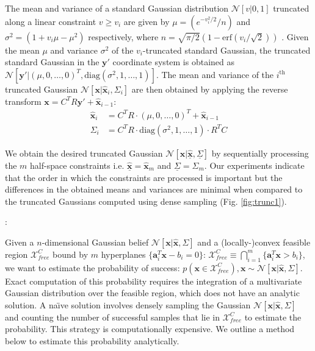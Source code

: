 \documentclass[letterpaper]{article}
\begin{document}
The mean and variance of a standard Gaussian distribution $\mathcal{N}[v|0,1]$ truncated along a linear constraint $v \geq v_i$ are given by $\mu = (e^{-v_i^2/2}/n)$ and $\sigma^2 = (1 + v_i\mu - \mu^2)$ respectively, where $n = \sqrt{\pi/2}(1 - \mathrm{erf}(v_i/\sqrt{2}))$ \cite{Toussaint09a}. Given the mean $\mu$ and variance $\sigma^2$ of the $v_i$-truncated standard Gaussian, the truncated standard Gaussian in the $\mathbf{y}'$ coordinate system is obtained as $\mathcal{N}[\mathbf{y'}|(\mu,0,\ldots,0)^T, \mathrm{diag}(\sigma^2,1,\ldots,1)]$. The mean and variance of the $i^{\mathrm{th}}$ truncated Gaussian $\mathcal{N}[\mathbf{x}|\hat{\mathbf{x}}_{i}, \Sigma_{i}]$ are then obtained by applying the reverse transform $\mathbf{x} = C^{T}R\mathbf{y'} + \hat{\mathbf{x}}_{i-1}$:
\begin{align*}
\hat{\mathbf{x}}_{i} &= C^TR\cdot(\mu,0,\ldots,0)^T + \hat{\mathbf{x}}_{i-1} \\
\Sigma_{i} &= C^TR\cdot\mathrm{diag}(\sigma^2,1,\ldots,1)\cdot R^TC
\end{align*}

We obtain the desired truncated Gaussian $\mathcal{N}[\mathbf{x}|\underline{\hat{\mathbf{x}}}, \underline{\Sigma}]$ by sequentially processing the $m$ half-space constraints i.e. $\underline{\hat{\mathbf{x}}} = \hat{\mathbf{x}}_{m}$ and $\underline{\Sigma} = \Sigma_{m}$. Our experiments indicate that the order in which the constraints are processed is important but the differences in the obtained means and variances are minimal when compared to the truncated Gaussians computed using dense sampling (Fig. \ref{fig:trunc1}).

\vspace{10pt}
:

Given a $n$-dimensional Gaussian belief $\mathcal{N}[\mathbf{x}|\hat{\mathbf{x}}, \Sigma]$ and a (locally-)convex feasible region $\mathcal{X}_{free}^{C}$ bound by $m$ hyperplanes $\{\mathbf{a}_{i}^T \mathbf{x} - b_{i} = 0\}$: $\mathcal{X}_{free}^{C} \equiv \bigcap \limits_{i = 1}^{m} {\{\mathbf{a}_{i}^T \mathbf{x} > b_{i}\}}$, we want to estimate the probability of success: $p(\mathbf{x} \in \mathcal{X}_{free}^{C}), \mathbf{x} \sim \mathcal{N}[\mathbf{x}|\hat{\mathbf{x}}, \Sigma]$. Exact computation of this probability requires the integration of a multivariate Gaussian distribution over the feasible region, which does not have an analytic solution. A na\"{\i}ve solution involves densely sampling the Gaussian $\mathcal{N}[\mathbf{x}|\hat{\mathbf{x}}, \Sigma]$ and counting the number of successful samples that lie in $\mathcal{X}_{free}^{C}$ to estimate the probability. This strategy is computationally expensive. We outline a method below to estimate this probability analytically.
\end{document}
